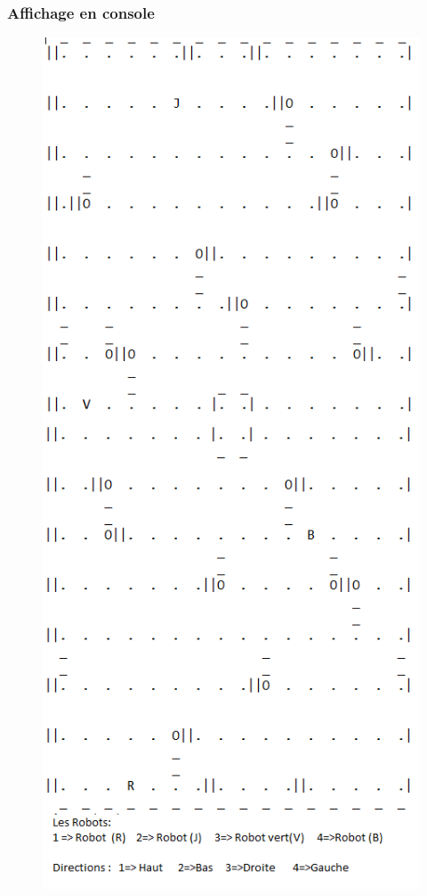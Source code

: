 \documentclass{beamer}
\begin{document}
	\begin{frame}
		\frametitle{Affichage en console}
			\begin{figure}[htpb]
			\includegraphics[scale=0.27]{./images/jeuConsole.png}
			\end{figure}
	\end{frame}
\end{document}
